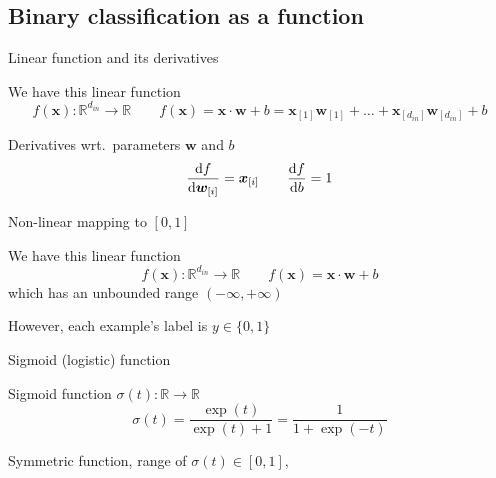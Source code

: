 \documentclass[12pt,aspectratio=169,handout]{beamer}
\begin{document}
\subsection{Binary classification as a function}

\begin{frame}{Linear function and its derivatives}
	
We have this linear function
$$f(\bm{x}) : \mathbb{R}^{d_{in}} \to \mathbb{R} \qquad
f(\bm{x}) = \bm{x} \cdot \bm{w} + b = \bm{x}_{[1]} \bm{w}_{[1]} + \ldots + \bm{x}_{[d_{in}]} \bm{w}_{[d_{in}]} + b $$

\pause
\begin{block}{Derivatives wrt.\ parameters $\bm{w}$ and $b$}
$$
\dv{f}{\bm{w}_{[i]}} = \bm{x}_{[i]} \qquad \dv{f}{b} = 1
$$
\end{block}


\end{frame}


\begin{frame}{Non-linear mapping to $[0, 1]$}

We have this linear function
$$f(\bm{x}) : \mathbb{R}^{d_{in}} \to \mathbb{R} \qquad
f(\bm{x}) = \bm{x} \cdot \bm{w} + b$$
which has an unbounded range $(-\infty, +\infty)$

\bigskip

However, each example's label is $y \in \{0, 1\}$

\end{frame}


\begin{frame}{Sigmoid (logistic) function}

\begin{block}{Sigmoid function $\sigma(t) : \mathbb{R} \to \mathbb{R}$}
	$$
	\sigma(t) = \frac{\exp(t)}{\exp(t) + 1} = \frac{1}{1 + \exp(-t)}
	$$
\end{block}


\begin{figure}
\end{figure}

Symmetric function, range of $\sigma(t) \in [0, 1]$, 

	
\end{frame}
\end{document}
